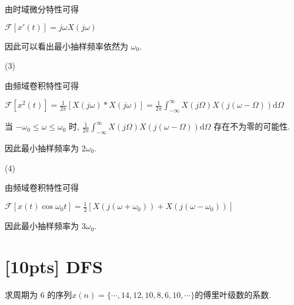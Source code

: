 \documentclass[a4paper,UTF8]{article}
\numberwithin{equation}{section}
\begin{document}
\begin{framed}
\begin{spacing}{1.5}
\begin{itemize}
        由时域微分特性可得
        
        $\displaystyle \mathcal{F}[x'(t)] = j\omega X(j\omega)$
        
        因此可以看出最小抽样频率依然为 $\omega_0$.
        
        (3)
        
        由频域卷积特性可得
        
        $\displaystyle \mathcal{F}[x^{2}(t)] = \frac{1}{2\pi}[X(j\omega) * X(j\omega)] = \frac{1}{2\pi} \int_{-\infty}^{\infty}X(j\Omega)X(j(\omega-\Omega))\mathrm{d}\Omega$
        
        当 $-\omega_0 \le \omega \le \omega_0$ 时, $\displaystyle \frac{1}{2\pi} \int_{-\infty}^{\infty}X(j\Omega)X(j(\omega-\Omega))\mathrm{d}\Omega$ 存在不为零的可能性.
        
        因此最小抽样频率为 $2\omega_0$.
        
        (4)
        
        由频域卷积特性可得
        
        $\displaystyle \mathcal{F}[x(t)\cos \omega_0 t] = \frac{1}{2}[X(j(\omega+\omega_0)) + X(j(\omega-\omega_0))]$
        
        因此最小抽样频率为 $3\omega_0$.
			\end{itemize}
		\end{spacing}
	\end{framed}
	
	\newpage
	\section{[10pts] DFS}
	求周期为 6 的序列$ x(n)=\{\cdots, 14, 12, 10, 8, 6, 10, \cdots\} $的傅里叶级数的系数.
	
\end{document}
